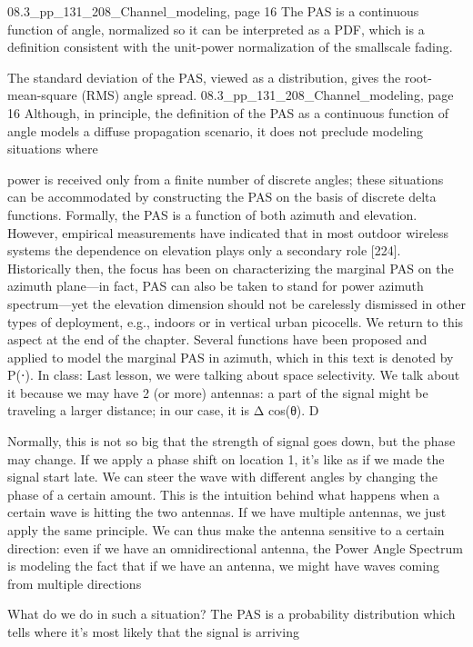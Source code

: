 {{{{08.3_pp_131_208_Channel_modeling, page 16 The PAS is a continuous function of angle, normalized so it can be interpreted as a PDF, which is a definition consistent with the unit-power normalization of the smallscale fading.

The standard deviation of the PAS, viewed as a distribution, gives the root-mean-square
(RMS) angle spread.
08.3_pp_131_208_Channel_modeling, page 16 Although, in principle, the definition of the PAS as a continuous function of angle models a diffuse propagation scenario, it does not preclude modeling situations where

power is received only from a finite number of discrete angles; these situations can be accommodated by constructing the PAS on the basis of discrete delta functions.
Formally, the PAS is a function of both azimuth and elevation. However, empirical measurements have indicated that in most outdoor wireless systems the dependence on elevation plays only a secondary role [224]. Historically then, the focus has been on characterizing the marginal PAS on the azimuth plane—in fact, PAS can also be taken to stand for power azimuth spectrum—yet the elevation dimension should not be carelessly dismissed in other types of deployment, e.g., indoors or in vertical urban picocells. We return to this aspect at the end of the chapter. Several functions have been proposed and applied to model the marginal PAS in azimuth, which in this text is denoted by P(⋅).
In class:
Last lesson, we were talking about space selectivity. We talk about it because we may have 2 (or more) antennas: a part of the signal might be traveling a larger distance; in our case, it is Δ cos(θ).
D

Normally, this is not so big that the strength of signal goes down, but the phase may change. If we apply a phase shift on location 1, it's like as if we made the signal start late. We can steer the wave with different angles by changing the phase of a certain amount. This is the intuition behind what happens when a certain wave is hitting the two antennas. If we have multiple antennas, we just apply the same principle.
We can thus make the antenna sensitive to a certain direction: even if we have an omnidirectional antenna, the Power Angle Spectrum is modeling the fact that if we have an antenna, we might have waves coming from multiple directions

What do we do in such a situation? The PAS is a probability distribution which tells where it's most likely that the signal is arriving

}}}}
